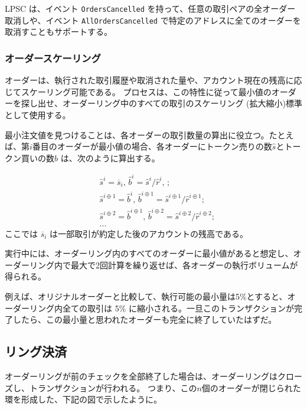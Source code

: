 \documentclass{article}
\makeatletter
\newenvironment{figurehere}
 {\def\@captype{figure}}
 {}
\makeatother
\begin{document}
\begin{multicols}{2}
LPSC は、イベント \verb|OrdersCancelled| を持って、任意の取引ペアの全オーダー取消しや、イベント \verb|AllOrdersCancelled| で特定のアドレスに全てのオーダーを取消すこともサポートする。


\subsubsection{オーダースケーリング \label{sec:order_scaling}}
オーダーは、執行された取引履歴や取消された量や、アカウント現在の残高に応じてスケーリング可能である。 プロセスは、この特性に従って最小値のオーダーを探し出せ、オーダーリング中のすべての取引のスケーリング (拡大縮小)標準として使用する。

最小注文値を見つけることは、各オーダーの取引数量の算出に役立つ。たとえば、第$i$番目のオーダーが最小値の場合、各オーダーにトークン売りの数$ \hat{s}$とトークン買いの数$ \hat{b}$ は、次のように算出する。

\[
\begin{split}
&\hat{s}^{i}=\overline{s}_i\text{, } \hat{b}^{i}=\hat{s}^{i}/ \hat{r}^i\text{, }\text{;}\\
&\hat{s}^{i\oplus 1}=\hat{b}^i\text{, } \hat{b}^{i\oplus 1}=\hat{s}^{i\oplus 1}/ \hat{r}^{i\oplus 1}\text{;}\\
&\hat{s}^{i\oplus 2}=\hat{b}^{i\oplus 1}\text{, } \hat{b}^{i\oplus 2}=\hat{s}^{i\oplus 2}/ \hat{r}^{i\oplus 2}\text{;}\\
& ...
\end{split}
\]
ここでは $\overline{s}_i$ は一部取引が約定した後のアカウントの残高である。

実行中には、オーダーリング内のすべてのオーダーに最小値があると想定し、オーダーリング内で最大で2回計算を繰り返せば、各オーダーの執行ボリュームが得られる。

例えば、オリジナルオーダーと比較して、執行可能の最小量は5\%とすると、オーダーリング内全ての取引は 5\% に縮小される。一旦このトランザクションが完了したら、この最小量と思われたオーダーも完全に終了していたはずだ。

\subsection{リング決済\label{sec:settlement}}

オーダーリングが前のチェックを全部終了した場合は、オーダーリングはクローズし、トランザクションが行われる。 つまり、この$n$個のオーダーが閉じられた環を形成した、下記の図で示したように。

\begin{center}
\begin{figurehere}
\centering
\begin{tikzpicture}[
circle/.style={
		scale=0.75,
		rounded corners,
		draw=black, 
		text centered,
		}
]


\end{tikzpicture}
\end{figurehere}
\end{center}
\end{multicols}
\end{document}
